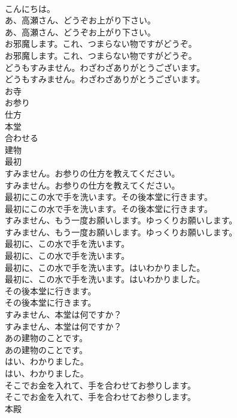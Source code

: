 \documentclass[8pt]{extreport}
\begin{document}
\begin{CJK}{UTF8}{min}
\\	こんにちは。 
\\	あ、高瀬さん、どうぞお上がり下さい。	
\\	あ、高瀬さん、どうぞお上がり下さい。 
\\	お邪魔します。これ、つまらない物ですがどうぞ。	
\\	お邪魔します。これ、つまらない物ですがどうぞ。 
\\	どうもすみません。わざわざありがとうございます。	
\\	どうもすみません。わざわざありがとうございます。 
\\	お寺
\\	お参り
\\	仕方
\\	本堂
\\	合わせる
\\	建物
\\	最初
\\	すみません。お参りの仕方を教えてください。	
\\	すみません。お参りの仕方を教えてください。 
\\	最初にこの水で手を洗います。その後本堂に行きます。	
\\	最初にこの水で手を洗います。その後本堂に行きます。 
\\	すみません、もう一度お願いします。ゆっくりお願いします。	
\\	すみません、もう一度お願いします。ゆっくりお願いします。 
\\	最初に、この水で手を洗います。	
\\	最初に、この水で手を洗います。 
\\	最初に、この水で手を洗います。はいわかりました。	
\\	最初に、この水で手を洗います。はいわかりました。 
\\	その後本堂に行きます。	
\\	その後本堂に行きます。 
\\	すみません、本堂は何ですか？	
\\	すみません、本堂は何ですか？ 
\\	あの建物のことです。	
\\	あの建物のことです。 
\\	はい、わかりました。	
\\	はい、わかりました。 
\\	そこでお金を入れて、手を合わせてお参りします。	
\\	そこでお金を入れて、手を合わせてお参りします。 
\\	本殿

\end{CJK}
\end{document}
